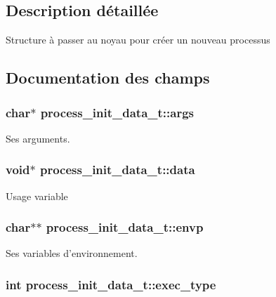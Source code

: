 \subsection{Description détaillée}
Structure à passer au noyau pour créer un nouveau processus 

\subsection{Documentation des champs}
\hypertarget{structprocess__init__data__t_a16d011771835f06e0bb3d5fd6115e13c}{
\subsubsection[{args}]{\setlength{\rightskip}{0pt plus 5cm}char$\ast$ process\-\_\-init\-\_\-data\-\_\-t\-::args}}\label{structprocess__init__data__t_a16d011771835f06e0bb3d5fd6115e13c}
Ses arguments. \hypertarget{structprocess__init__data__t_ae950cc2a2cc04d1c00a71f70c2fde72c}{
\subsubsection[{data}]{\setlength{\rightskip}{0pt plus 5cm}void$\ast$ process\-\_\-init\-\_\-data\-\_\-t\-::data}}\label{structprocess__init__data__t_ae950cc2a2cc04d1c00a71f70c2fde72c}
Usage variable \hypertarget{structprocess__init__data__t_a863d82fbd718f53164a520f67376eac2}{
\subsubsection[{envp}]{\setlength{\rightskip}{0pt plus 5cm}char$\ast$$\ast$ process\-\_\-init\-\_\-data\-\_\-t\-::envp}}\label{structprocess__init__data__t_a863d82fbd718f53164a520f67376eac2}
Ses variables d'environnement. \hypertarget{structprocess__init__data__t_a1cda790f7d2446a04562094f09e358ab}{
\subsubsection[{exec\-\_\-type}]{\setlength{\rightskip}{0pt plus 5cm}int process\-\_\-init\-\_\-data\-\_\-t\-::exec\-\_\-type}}\label{structprocess__init__data__t_a1cda790f7d2446a04562094f09e358ab}
